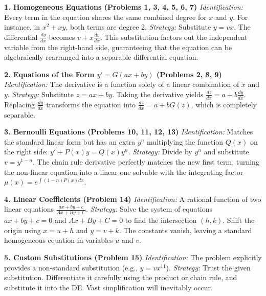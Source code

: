 \documentclass[11pt]{article}
\begin{document}
\textbf{1. Homogeneous Equations (Problems 1, 3, 4, 5, 6, 7)}
\textit{Identification:} Every term in the equation shares the same combined degree for $x$ and $y$. For instance, in $x^2 + xy$, both terms are degree 2.
\textit{Strategy:} Substitute $y = vx$. The differential $\frac{dy}{dx}$ becomes $v + x\frac{dv}{dx}$. This substitution factors out the independent variable from the right-hand side, guaranteeing that the equation can be algebraically rearranged into a separable differential equation.

\textbf{2. Equations of the Form $y' = G(ax+by)$ (Problems 2, 8, 9)}
\textit{Identification:} The derivative is a function solely of a linear combination of $x$ and $y$.
\textit{Strategy:} Substitute $z = ax+by$. Taking the derivative yields $\frac{dz}{dx} = a + b\frac{dy}{dx}$. Replacing $\frac{dy}{dx}$ transforms the equation into $\frac{dz}{dx} = a + bG(z)$, which is completely separable.

\textbf{3. Bernoulli Equations (Problems 10, 11, 12, 13)}
\textit{Identification:} Matches the standard linear form but has an extra $y^n$ multiplying the function $Q(x)$ on the right side: $y' + P(x)y = Q(x)y^n$.
\textit{Strategy:} Divide by $y^n$ and substitute $v = y^{1-n}$. The chain rule derivative perfectly matches the new first term, turning the non-linear equation into a linear one solvable with the integrating factor $\mu(x) = e^{\int (1-n)P(x)dx}$.

\textbf{4. Linear Coefficients (Problem 14)}
\textit{Identification:} A rational function of two linear equations $\frac{ax+by+c}{Ax+By+C}$.
\textit{Strategy:} Solve the system of equations $ax+by+c=0$ and $Ax+By+C=0$ to find the intersection $(h,k)$. Shift the origin using $x = u+h$ and $y = v+k$. The constants vanish, leaving a standard homogeneous equation in variables $u$ and $v$.

\textbf{5. Custom Substitutions (Problem 15)}
\textit{Identification:} The problem explicitly provides a non-standard substitution (e.g., $y = vx^{11}$).
\textit{Strategy:} Trust the given substitution. Differentiate it carefully using the product or chain rule, and substitute it into the DE. Vast simplification will inevitably occur.
\end{document}
